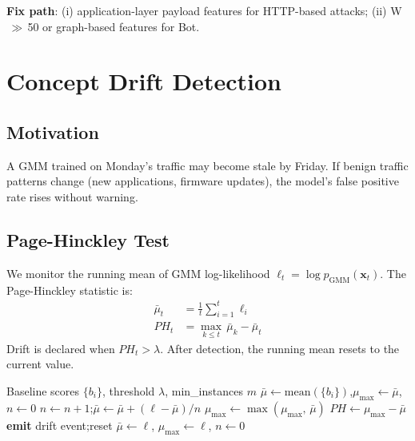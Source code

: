 \documentclass[conference]{IEEEtran}
\begin{document}
\textbf{Fix path}: (i) application-layer payload features for HTTP-based
attacks; (ii) W$\,\gg\,$50 or graph-based features for Bot.

\section{Concept Drift Detection}

\subsection{Motivation}

A GMM trained on Monday's traffic may become stale by Friday.  If benign
traffic patterns change (new applications, firmware updates), the model's
false positive rate rises without warning.

\subsection{Page-Hinckley Test}

We monitor the running mean of GMM log-likelihood $\ell_t =
\log p_{\text{GMM}}(\mathbf{x}_t)$.  The Page-Hinckley statistic is:
\begin{align}
  \bar{\mu}_t &= \frac{1}{t}\sum_{i=1}^{t} \ell_i \\
  PH_t &= \max_{k\le t}\,\bar{\mu}_k - \bar{\mu}_t
\end{align}
Drift is declared when $PH_t > \lambda$.  After detection, the running
mean resets to the current value.

\begin{algorithm}[h]
\caption{Page-Hinckley Drift Detection}
\begin{algorithmic}[1]
\Require Baseline scores $\{b_i\}$, threshold $\lambda$, min\_instances $m$
\State $\bar{\mu} \gets \text{mean}(\{b_i\})$,\quad $\mu_{\max} \gets \bar{\mu}$,\quad $n \gets 0$
  \State $n \gets n+1$;\quad $\bar{\mu} \gets \bar{\mu} + (\ell - \bar{\mu})/n$
  \State $\mu_{\max} \gets \max(\mu_{\max},\, \bar{\mu})$
  \State $PH \gets \mu_{\max} - \bar{\mu}$
    \State \textbf{emit} drift event;\quad reset $\bar{\mu} \gets \ell$,\; $\mu_{\max} \gets \ell$,\; $n \gets 0$
  \EndIf
\EndFor
\end{algorithmic}
\end{algorithm}
\end{document}
